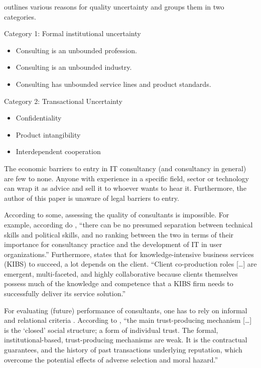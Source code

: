 \documentclass[12pt]{article}
\providecommand{\tightlist}{%
  \setlength{\itemsep}{0pt}\setlength{\parskip}{0pt}}
\begin{document}
\citep[ 69-75]{armbruster2006} outlines various reasons for quality
uncertainty and groups them in two categories.

Category 1: Formal institutional uncertainty

\begin{itemize}
\tightlist
\item
  Consulting is an unbounded profession.
\item
  Consulting is an unbounded industry.
\item
  Consulting has unbounded service lines and product standards.
\end{itemize}

Category 2: Transactional Uncertainty

\begin{itemize}
\tightlist
\item
  Confidentiality
\item
  Product intangibility
\item
  Interdependent cooperation
\end{itemize}

The economic barriers to entry \citep[ 463]{fee2004} in IT consultancy
(and consultancy in general) are few to none. Anyone with experience in
a specific field, sector or technology can wrap it as advice and sell it
to whoever wants to hear it. Furthermore, the author of this paper is
unaware of legal barriers to entry.

According to some, assessing the quality of consultants is impossible.
For example, according do \citet[40]{bloomfield1995}, ``there can be no
presumed separation between technical skills and political skills, and
no ranking between the two in terms of their importance for consultancy
practice and the development of IT in user organizations.'' Furthermore,
\citet[101-102]{bettencourt2002} states that for knowledge-intensive
business services (KIBS) to succeed, a lot depends on the client.
``Client co-production roles {[}\ldots{]} are emergent, multi-faceted,
and highly collaborative because clients themselves possess much of the
knowledge and competence that a KIBS firm needs to successfully deliver
its service solution.''

For evaluating (future) performance of consultants, one has to rely on
informal and relational criteria \citep[ 277]{wright2002}. According to
\citet[250]{clark1993}, ``the main trust-producing mechanism
{[}\ldots{]} is the `closed' social structure; a form of individual
trust. The formal, institutional-based, trust-producing mechanisms are
weak. It is the contractual guarantees, and the history of past
transactions underlying reputation, which overcome the potential effects
of adverse selection and moral hazard.''
\end{document}
